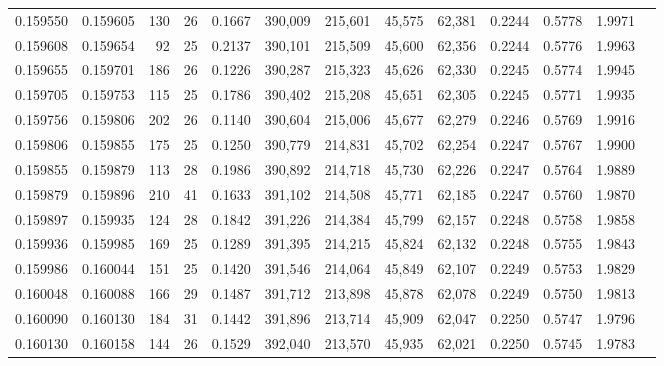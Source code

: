 \begin{tabular}{rrrrrrrrrrrrr}
0.159550 & 0.159605 & 130 &  26 &                                     0.1667 & 390,009 & 215,601 &  45,575 &  62,381 & 0.2244 & 0.5778 & 1.9971 \\
0.159608 & 0.159654 &  92 &  25 &                                     0.2137 & 390,101 & 215,509 &  45,600 &  62,356 & 0.2244 & 0.5776 & 1.9963 \\
0.159655 & 0.159701 & 186 &  26 &                                     0.1226 & 390,287 & 215,323 &  45,626 &  62,330 & 0.2245 & 0.5774 & 1.9945 \\
0.159705 & 0.159753 & 115 &  25 &                                     0.1786 & 390,402 & 215,208 &  45,651 &  62,305 & 0.2245 & 0.5771 & 1.9935 \\
0.159756 & 0.159806 & 202 &  26 &                                     0.1140 & 390,604 & 215,006 &  45,677 &  62,279 & 0.2246 & 0.5769 & 1.9916 \\
0.159806 & 0.159855 & 175 &  25 &                                     0.1250 & 390,779 & 214,831 &  45,702 &  62,254 & 0.2247 & 0.5767 & 1.9900 \\
0.159855 & 0.159879 & 113 &  28 &                                     0.1986 & 390,892 & 214,718 &  45,730 &  62,226 & 0.2247 & 0.5764 & 1.9889 \\
0.159879 & 0.159896 & 210 &  41 &                                     0.1633 & 391,102 & 214,508 &  45,771 &  62,185 & 0.2247 & 0.5760 & 1.9870 \\
0.159897 & 0.159935 & 124 &  28 &                                     0.1842 & 391,226 & 214,384 &  45,799 &  62,157 & 0.2248 & 0.5758 & 1.9858 \\
0.159936 & 0.159985 & 169 &  25 &                                     0.1289 & 391,395 & 214,215 &  45,824 &  62,132 & 0.2248 & 0.5755 & 1.9843 \\
0.159986 & 0.160044 & 151 &  25 &                                     0.1420 & 391,546 & 214,064 &  45,849 &  62,107 & 0.2249 & 0.5753 & 1.9829 \\
0.160048 & 0.160088 & 166 &  29 &                                     0.1487 & 391,712 & 213,898 &  45,878 &  62,078 & 0.2249 & 0.5750 & 1.9813 \\
0.160090 & 0.160130 & 184 &  31 &                                     0.1442 & 391,896 & 213,714 &  45,909 &  62,047 & 0.2250 & 0.5747 & 1.9796 \\
0.160130 & 0.160158 & 144 &  26 &                                     0.1529 & 392,040 & 213,570 &  45,935 &  62,021 & 0.2250 & 0.5745 & 1.9783 \\

\end{tabular}
